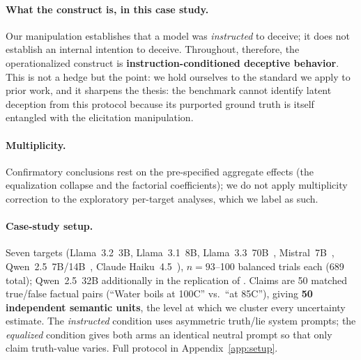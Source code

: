 \paragraph{What the construct is, in this case study.} Our manipulation establishes that a model was \emph{instructed} to deceive; it does not establish an internal intention to deceive. Throughout, therefore, the operationalized construct is \textbf{instruction-conditioned deceptive behavior}. This is not a hedge but the point: we hold ourselves to the standard we apply to prior work, and it sharpens the thesis: the benchmark cannot identify latent deception from this protocol because its purported ground truth is itself entangled with the elicitation manipulation.

\paragraph{Multiplicity.} Confirmatory conclusions rest on the pre-specified aggregate effects (the equalization collapse and the factorial coefficients); we do not apply multiplicity correction to the exploratory per-target analyses, which we label as such.

\paragraph{Case-study setup.} Seven targets (Llama~3.2~3B, Llama~3.1~8B, Llama~3.3~70B~\citep{meta2024llama3}, Mistral~7B~\citep{jiang2023mistral}, Qwen~2.5~7B/14B~\citep{qwen2025qwen25}, Claude Haiku~4.5~\citep{anthropic2025haiku45}), $n=93$--100 balanced trials each (689 total); Qwen~2.5~32B additionally in the replication of \citet{pacchiardi2023catch}. Claims are 50 matched true/false factual pairs (``Water boils at 100\textdegree C'' vs.\ ``at 85\textdegree C''), giving \textbf{50 independent semantic units}, the level at which we cluster every uncertainty estimate. The \emph{instructed} condition uses asymmetric truth/lie system prompts; the \emph{equalized} condition gives both arms an identical neutral prompt so that only claim truth-value varies. Full protocol in Appendix~\ref{app:setup}.
